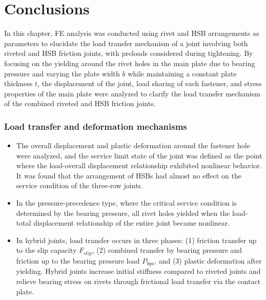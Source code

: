 \section{Conclusions}

In this chapter, FE analysis was conducted using rivet and \ac{HSB} arrangements as parameters to elucidate the load transfer mechanism of a joint involving both riveted and \ac{HSB} friction joints, with preloads considered during tightening. By focusing on the yielding around the rivet holes in the main plate due to bearing pressure and varying the plate width \(b\) while maintaining a constant plate thickness \(t\), the displacement of the joint, load sharing of each fastener, and stress properties of the main plate were analyzed to clarify the load transfer mechanism of the combined riveted and \ac{HSB} friction joints.

\subsubsection*{Load transfer and deformation mechanisms}
\begin{itemize}
    \item The overall displacement and plastic deformation around the fastener hole were analyzed, and the service limit state of the joint was defined as the point where the load-overall displacement relationship exhibited nonlinear behavior. It was found that the arrangement of \ac{HSB}s had almost no effect on the service condition of the three-row joints.
    \item In the pressure-precedence type, where the critical service condition is determined by the bearing pressure, all rivet holes yielded when the load-total displacement relationship of the entire joint became nonlinear.
    \item In hybrid joints, load transfer occurs in three phases: (1) friction transfer up to the slip capacity $F_{slip}$, (2) combined transfer by bearing pressure and friction up to the bearing pressure load $P_{bya}$, and (3) plastic deformation after yielding. Hybrid joints increase initial stiffness compared to riveted joints and relieve bearing stress on rivets through frictional load transfer via the contact plate.
\end{itemize}

